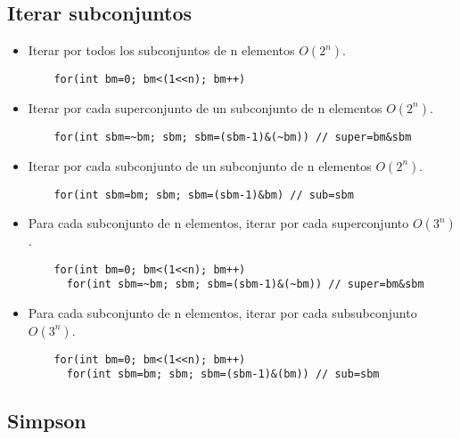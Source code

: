 \documentclass[a4paper,11pt,landscape,twocolumn]{article}
\begin{document}


\subsection{Iterar subconjuntos}

\begin{itemize}
  \item Iterar por todos los subconjuntos de n elementos $O(2^n)$.
  \begin{lstlisting}
    for(int bm=0; bm<(1<<n); bm++)
  \end{lstlisting}

  \item Iterar por cada superconjunto de un subconjunto de n elementos $O(2^n)$.
  \begin{lstlisting}
    for(int sbm=~bm; sbm; sbm=(sbm-1)&(~bm)) // super=bm&sbm
  \end{lstlisting}

  \item Iterar por cada subconjunto de un subconjunto de n elementos $O(2^n)$.
  \begin{lstlisting}
    for(int sbm=bm; sbm; sbm=(sbm-1)&bm) // sub=sbm
  \end{lstlisting}

  \item Para cada subconjunto de n elementos, iterar por cada superconjunto $O(3^n)$.
  \begin{lstlisting}
    for(int bm=0; bm<(1<<n); bm++)
      for(int sbm=~bm; sbm; sbm=(sbm-1)&(~bm)) // super=bm&sbm
  \end{lstlisting}

  \item Para cada subconjunto de n elementos, iterar por cada subsubconjunto $O(3^n)$.
  \begin{lstlisting}
    for(int bm=0; bm<(1<<n); bm++)
      for(int sbm=bm; sbm; sbm=(sbm-1)&(bm)) // sub=sbm
  \end{lstlisting}
\end{itemize}

\subsection{Simpson}


\end{document}
